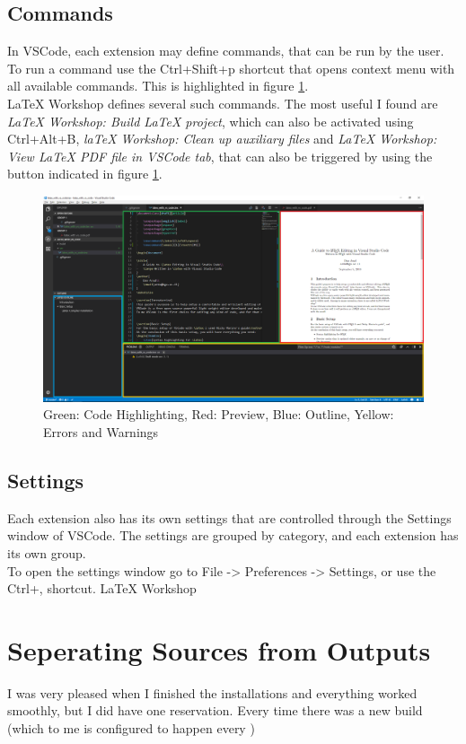 \documentclass{article}
\newcommand{\latex}{\LaTeX\xspace}
\begin{document}
\subsection{Commands}
In VSCode, each extension may define commands, that can be run by the user. To run a command use the Ctrl+Shift+p shortcut that opens context menu with all available commands. This is highlighted in figure \ref{fig:command_menu}.\\
\latex Workshop defines several such commands. The most useful I found are \emph{LaTeX Workshop: Build LaTeX project}, which can also be activated using Ctrl+Alt+B, \emph{laTeX Workshop: Clean up auxiliary files} and \emph{LaTeX Workshop: View LaTeX PDF file in VSCode tab}, that can also be triggered by using the button indicated in figure \ref{fig:command_menu}.
\begin{figure}
	\includegraphics[width=\linewidth]{../resources/vscode_with_latex_highlights.png}
	\caption{Green: Code Highlighting, Red: Preview, Blue: Outline, Yellow: Errors and Warnings}
	\label{fig:command_menu}
\end{figure}

\subsection{Settings}
Each extension also has its own settings that are controlled through the Settings window of VSCode. The settings are grouped by category, and each extension has its own group.\\
To open the settings window go to File -> Preferences -> Settings, or use the Ctrl+, shortcut.
\latex Workshop

\section{Seperating Sources from Outputs}
I was very pleased when I finished the installations and everything worked smoothly, but I did have one reservation. Every time there was a new build (which to me is configured to happen every )
\end{document}
